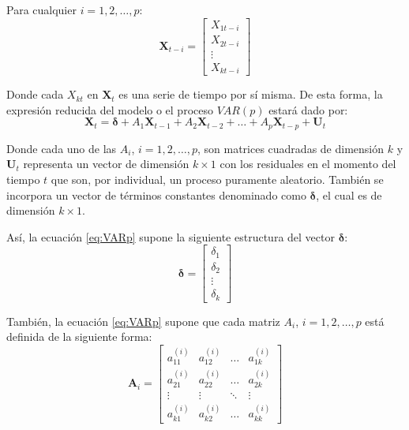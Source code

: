 \documentclass[
]{book}
\begin{document}
Para cualquier \(i = 1, 2, \ldots, p\):
\begin{equation*}
    \mathbf{X}_{t-i} = 
    \begin{bmatrix}
    X_{1t-i} \\ X_{2t-i} \\ \vdots \\ X_{kt-i}
    \end{bmatrix}
\end{equation*}

Donde cada \(X_{kt}\) en \(\mathbf{X}_t\) es una serie de tiempo por sí misma. De esta forma, la expresión reducida del modelo o el proceso \(VAR(p)\) estará dado por:
\begin{equation}
    \mathbf{X}_t = \boldsymbol{\delta} + A_1 \mathbf{X}_{t-1} + A_2 \mathbf{X}_{t-2} + \ldots + A_p \mathbf{X}_{t-p} + \mathbf{U}_{t}
    \label{eq:VARp}
\end{equation}

Donde cada uno de las \(A_i\), \(i = 1, 2, \ldots, p\), son matrices cuadradas de dimensión \(k\) y \(\mathbf{U}_t\) representa un vector de dimensión \(k \times 1\) con los residuales en el momento del tiempo \(t\) que son, por individual, un proceso puramente aleatorio. También se incorpora un vector de términos constantes denominado como \(\mathbf{\delta}\), el cual es de dimensión \(k \times 1\).

Así, la ecuación \eqref{eq:VARp} supone la siguiente estructura del vector \(\boldsymbol{\delta}\):
\begin{equation*}
    \boldsymbol{\delta} = 
    \begin{bmatrix}
    \delta_{1} \\ \delta_{2} \\ \vdots \\ \delta_{k}
    \end{bmatrix}
\end{equation*}

También, la ecuación \eqref{eq:VARp} supone que cada matriz \(A_i\), \(i = 1, 2, \ldots, p\) está definida de la siguiente forma:
\begin{equation*}
    \mathbf{A}_i = 
    \begin{bmatrix}
    a^{(i)}_{11} & a^{(i)}_{12} & \ldots & a^{(i)}_{1k} \\ a^{(i)}_{21} & a^{(i)}_{22} & \ldots & a^{(i)}_{2k} \\ \vdots & \vdots & \ddots & \vdots \\ a^{(i)}_{k1} & a^{(i)}_{k2} & \ldots & a^{(i)}_{kk}
    \end{bmatrix}
\end{equation*}
\end{document}
